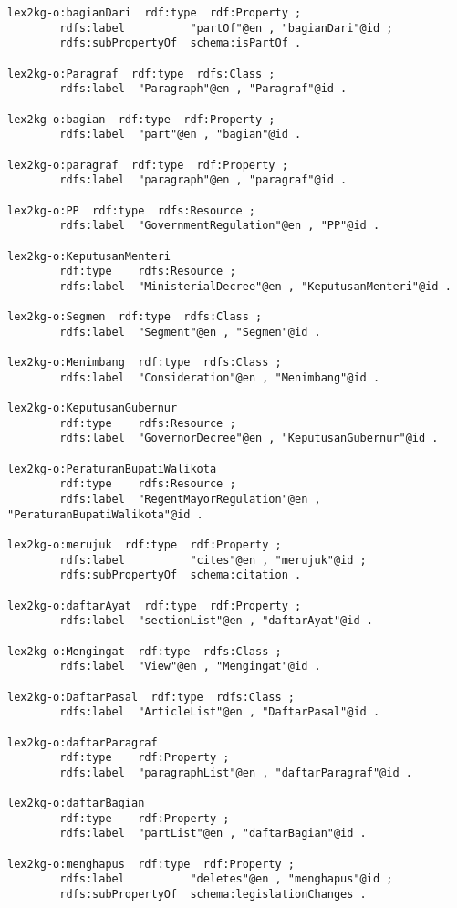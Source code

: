 \begin{lstlisting}
lex2kg-o:bagianDari  rdf:type  rdf:Property ;
        rdfs:label          "partOf"@en , "bagianDari"@id ;
        rdfs:subPropertyOf  schema:isPartOf .

lex2kg-o:Paragraf  rdf:type  rdfs:Class ;
        rdfs:label  "Paragraph"@en , "Paragraf"@id .

lex2kg-o:bagian  rdf:type  rdf:Property ;
        rdfs:label  "part"@en , "bagian"@id .

lex2kg-o:paragraf  rdf:type  rdf:Property ;
        rdfs:label  "paragraph"@en , "paragraf"@id .

lex2kg-o:PP  rdf:type  rdfs:Resource ;
        rdfs:label  "GovernmentRegulation"@en , "PP"@id .

lex2kg-o:KeputusanMenteri
        rdf:type    rdfs:Resource ;
        rdfs:label  "MinisterialDecree"@en , "KeputusanMenteri"@id .

lex2kg-o:Segmen  rdf:type  rdfs:Class ;
        rdfs:label  "Segment"@en , "Segmen"@id .

lex2kg-o:Menimbang  rdf:type  rdfs:Class ;
        rdfs:label  "Consideration"@en , "Menimbang"@id .

lex2kg-o:KeputusanGubernur
        rdf:type    rdfs:Resource ;
        rdfs:label  "GovernorDecree"@en , "KeputusanGubernur"@id .

lex2kg-o:PeraturanBupatiWalikota
        rdf:type    rdfs:Resource ;
        rdfs:label  "RegentMayorRegulation"@en , "PeraturanBupatiWalikota"@id .

lex2kg-o:merujuk  rdf:type  rdf:Property ;
        rdfs:label          "cites"@en , "merujuk"@id ;
        rdfs:subPropertyOf  schema:citation .

lex2kg-o:daftarAyat  rdf:type  rdf:Property ;
        rdfs:label  "sectionList"@en , "daftarAyat"@id .

lex2kg-o:Mengingat  rdf:type  rdfs:Class ;
        rdfs:label  "View"@en , "Mengingat"@id .

lex2kg-o:DaftarPasal  rdf:type  rdfs:Class ;
        rdfs:label  "ArticleList"@en , "DaftarPasal"@id .

lex2kg-o:daftarParagraf
        rdf:type    rdf:Property ;
        rdfs:label  "paragraphList"@en , "daftarParagraf"@id .

lex2kg-o:daftarBagian
        rdf:type    rdf:Property ;
        rdfs:label  "partList"@en , "daftarBagian"@id .

lex2kg-o:menghapus  rdf:type  rdf:Property ;
        rdfs:label          "deletes"@en , "menghapus"@id ;
        rdfs:subPropertyOf  schema:legislationChanges .


\end{lstlisting}
